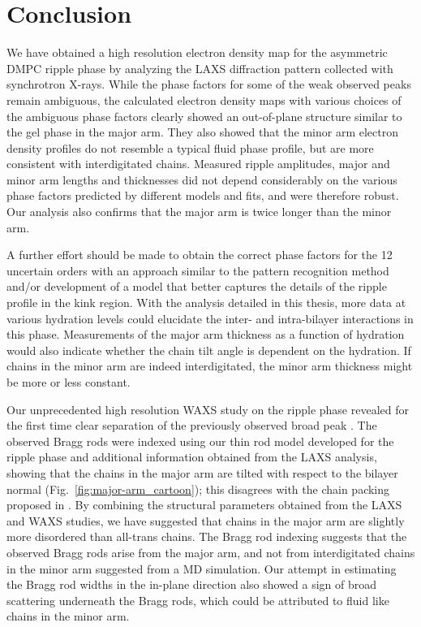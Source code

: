 \section{Conclusion}\label{sec:ripple_conclusion}
We have obtained a high resolution electron density map for the asymmetric
DMPC ripple phase by analyzing the LAXS diffraction pattern collected with
synchrotron X-rays. 
While the phase factors for some of the weak observed peaks
remain ambiguous, the calculated electron density maps with various choices
of the ambiguous phase
factors clearly showed an out-of-plane structure similar to the gel phase
in the major arm. They also showed that the minor arm electron density profiles
do not resemble a typical fluid phase profile, but are more consistent with
interdigitated chains.
Measured ripple amplitudes, major and minor arm lengths and thicknesses
did not depend considerably on the various phase factors predicted by 
different models and fits, and were therefore robust. 
Our analysis also confirms that the major arm is twice longer than the minor arm.

A further effort should be made to obtain the correct phase factors for the 12 uncertain orders
with an approach similar to the pattern recognition method
and/or development of a model that better captures the details of the ripple
profile in the kink region. 
With the analysis detailed in this thesis,
more data at various hydration levels could elucidate the 
inter- and intra-bilayer interactions in this phase.
Measurements of the major arm thickness as a function of hydration
would also indicate whether the chain tilt angle is dependent on the hydration.
If chains in the minor arm are indeed interdigitated, the minor arm thickness
might be more or less constant.

Our unprecedented high resolution WAXS study on the ripple phase 
revealed for the first time
clear separation of the previously observed broad peak \cite{ref:Katsaras95}.
The observed Bragg rods were indexed using our thin rod model developed 
for the ripple phase and additional information obtained from the LAXS
analysis, showing that the chains in the major arm are 
tilted with respect to the bilayer normal (Fig.~\ref{fig:major-arm_cartoon});
this disagrees with the chain packing proposed in \cite{ref:Sengupta00,ref:Sengupta03}.
By combining the structural parameters obtained from the LAXS and WAXS studies,
we have suggested that chains in the major arm are slightly more 
disordered than all-trans chains.
The Bragg rod indexing suggests that the observed Bragg rods arise 
from the major arm, and not from interdigitated chains 
in the minor arm suggested from a MD simulation.
Our attempt in estimating the Bragg rod widths in the in-plane direction
also showed a sign of broad scattering underneath the Bragg rods,
which could be attributed to fluid like chains in the minor arm.

